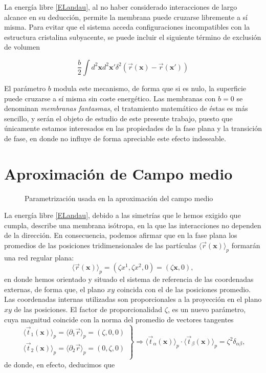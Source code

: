 La energía libre \eqref{ELandau}, al no haber considerado
interacciones de largo alcance en su deducción, permite la membrana puede
cruzarse libremente a sí misma. Para evitar que el sistema acceda
configuraciones incompatibles con la estructura cristalina subyacente, se
puede incluir el siguiente término de exclusión de volumen

\begin{equation*}
\frac{b}{2}\int d^2\mathbf{x} d^2\mathbf{x'}
\delta^2(\vec{r}(\mathbf{x})-\vec{r}(\mathbf{x'}))
\end{equation*}

El parámetro $b$ modula este mecanismo, de forma que si es nulo, la superficie
puede cruzarse a sí misma sin coste energético. Las membranas con $b=0$ se
denominan \textit{membranas fantasmas}, el tratamiento matemático de éstas es
 más sencillo, y serán el objeto de estudio de este presente
trabajo, puesto que únicamente estamos interesados en las propiedades de la
fase plana y la transición de fase, en donde no influye de forma apreciable
este efecto indeseable. 

\section{Aproximación de Campo medio}

\begin{figure}[h]
\centering
 \resizebox{\columnwidth}{!}{}
\caption{Parametrización usada en la aproximación del campo medio}
\end{figure}

La energía libre \eqref{ELandau}, debido a las simetrías que le hemos exigido
que cumpla, describe una membrana isótropa, en la que las interacciones no
dependen de la dirección. En consecuencia, podemos afirmar que en la fase
plana los promedios de las posiciones tridimensionales de las partículas
$\langle\vec{r}(\mathbf{x})\rangle_{p}$ formarán una red regular plana:  
\begin{equation*}
 \langle\vec{r}(\mathbf{x})\rangle_{p}=(\zeta x^1,\zeta x^2,0)=(\zeta \mathbf{x},0), 
\end{equation*}
en donde hemos orientado y situado el sistema de referencia de las coordenadas
externas, de forma que, el plano $xy$ coincida con el de las
posiciones promedio. Las coordenadas internas utilizadas son 
proporcionales a la proyección en el plano $xy$ de las posiciones. El factor
de proporcionalidad $\zeta$, es un nuevo parámetro, cuya magnitud coincide con
la norma del promedio de  vectores tangentes 
\begin{equation}
 \left.\begin{array}{c}
\langle\vec{t}_{1}(\mathbf{x})\rangle_{p}=\langle\partial_1\vec{r}\rangle_{p}=(\zeta ,0,0)\\
\langle\vec{t}_{2}(\mathbf{x})\rangle_{p}=\langle\partial_2\vec{r}\rangle_{p}=(0,\zeta ,0)\\
 \end{array}\right\}\Rightarrow
\langle\vec{t}_{\alpha}(\mathbf{x})\rangle_{p}\cdot\langle\vec{t}_{\beta}(\mathbf{x})\rangle_{p}=\zeta^2 \delta_{\alpha\beta},
\end{equation}
de donde, en efecto, deducimos que

